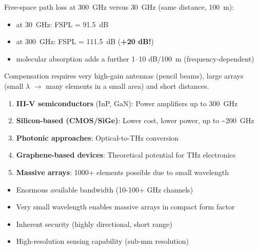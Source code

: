 
Free-space path loss at 300~GHz versus 30~GHz (same distance, 100~m):


\begin{itemize}
\tightlist
\item
  at 30~GHz: FSPL = 91.5~dB
\item
  at 300~GHz: FSPL = 111.5~dB (\textbf{+20 dB!})
\item
  molecular absorption adds a further 1–10 dB/\allowbreak{}100~m (frequency-dependent)
\end{itemize}

Compensation requires very high-gain antennas (pencil beams), large arrays (small $\lambda$ \ensuremath{\to} many elements in a small area) and short distances.


\begin{enumerate}
\def\labelenumi{\arabic{enumi}.}
\tightlist
\item
  \textbf{III-V semiconductors} (InP, GaN): Power amplifiers up to 300~GHz
\item
  \textbf{Silicon-based (CMOS/\allowbreak{}SiGe)}: Lower cost, lower power, up to \textasciitilde{}200~GHz
\item
  \textbf{Photonic approaches}: Optical-to-THz conversion
\item
  \textbf{Graphene-based devices}: Theoretical potential for THz electronics
\item
  \textbf{Massive arrays}: 1000+ elements possible due to small wavelength
\end{enumerate}


\begin{itemize}
\tightlist
\item
  Enormous available bandwidth (10-100+ GHz channels)
\item
  Very small wavelength enables massive arrays in compact form factor
\item
  Inherent security (highly directional, short range)
\item
  High-resolution sensing capability (sub-mm resolution)
\end{itemize}


